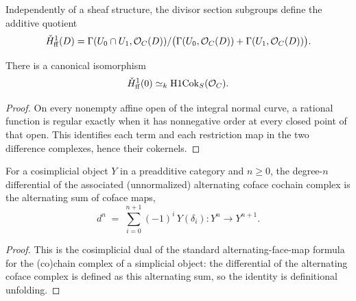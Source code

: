 \begin{definition}
  \label{mk-def:adelic_function_field_H1}
  \leanok

  Independently of a sheaf structure, the divisor section subgroups define
  the additive quotient
  \[
    \check H^1_{\mathrm{ff}}(D)
      =\Gamma(U_0\cap U_1,\mathcal{O}_{C}(D))/
        \bigl(\Gamma(U_0,\mathcal{O}_{C}(D))+\Gamma(U_1,\mathcal{O}_{C}(D))\bigr).
  \]
\end{definition}

\begin{proposition}
  \label{mk-thm:adelic_function_field_H1_zero_compare}
  There is a canonical isomorphism
  \[
    \check H^1_{\mathrm{ff}}(0)
      \simeq_k\operatorname{H1Cok}_S(\mathcal{O}_{C}).
  \]
\end{proposition}
\begin{proof}
  On every nonempty affine open of the integral normal curve, a rational
  function is regular exactly when it has nonnegative order at every
  closed point of that open.  This identifies each term and each
  restriction map in the two difference complexes, hence their cokernels.
\end{proof}

\begin{lemma}
  \label{mk-lem:adelic_alternatingCofaceMapComplex_objD}
  \leanok
  For a cosimplicial object \(Y\) in a preadditive category and \(n \ge
  0\), the degree-\(n\) differential of the associated (unnormalized)
  alternating coface cochain complex is the alternating sum of coface
  maps,
  \[
    d^n \;=\; \sum_{i = 0}^{n+1} (-1)^i\, Y(\delta_i) \colon Y^n \to
    Y^{n+1}.
  \]
\end{lemma}
\begin{proof}
  \leanok
  This is the cosimplicial dual of the standard alternating-face-map
  formula for the (co)chain complex of a simplicial object: the
  differential of the alternating coface complex is defined as this
  alternating sum, so the identity is definitional unfolding.
\end{proof}

